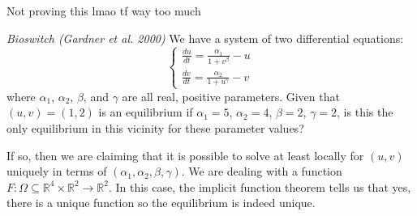 \documentclass[11pt]{article}
\theoremstyle{definition}
\newcommand{\R}{\mathbb{R}}                      %
\begin{document}
Not proving this lmao tf way too much

\ex \textit{Bioswitch (Gardner et al. 2000)} We have a system of two differential equations:
$$
\begin{cases}
    \frac{du}{dt}=\frac{\alpha_1}{1+v^\beta}-u\\
    \frac{dv}{dt}=\frac{\alpha_2}{1+u^\gamma}-v
\end{cases}
$$
where $\alpha_1$, $\alpha_2$, $\beta$, and $\gamma$ are all real, positive parameters. Given that $(u,v)=(1,2)$ is an equilibrium if $\alpha_1=5$, $\alpha_2=4$, $\beta=2$, $\gamma =2$, is this the only equilibrium in this vicinity for these parameter values?

If so, then we are claiming that it is possible to solve at least locally for $(u,v)$ uniquely in terms of $(\alpha_1,\alpha_2,\beta,\gamma)$. We are dealing with a function $F:\Omega \subseteq \R^4\times\R^2\to \R^2$. In this case, the implicit function theorem tells us that yes, there is a unique function so the equilibrium is indeed unique.
\end{document}
